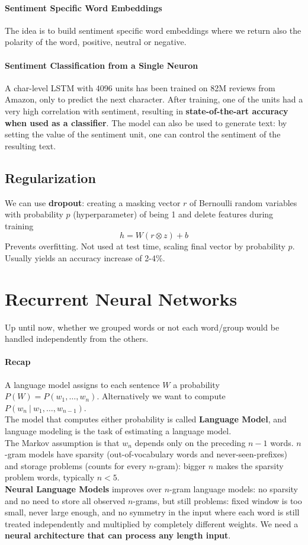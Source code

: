 \documentclass[10pt]{report}
\begin{document}
\paragraph{Sentiment Specific Word Embeddings} The idea is to build sentiment specific word embeddings where we return also the polarity of the word, positive, neutral or negative.
\paragraph{Sentiment Classification from a Single Neuron} A char-level LSTM with 4096 units has been trained on 82M reviews from Amazon, only to predict the next character. After training, one of the units had a very high correlation with sentiment, resulting in \textbf{state-of-the-art accuracy when used as a classifier}. The model can also be used to generate text: by setting the value of the sentiment unit, one can control the sentiment of the resulting text.
\subsection{Regularization} 
We can use \textbf{dropout}: creating a masking vector $r$ of Bernoulli random variables with probability $p$ (hyperparameter) of being 1 and delete features during training $$h = W(r\otimes z) + b$$
Prevents overfitting. Not used at test time, scaling final vector by probability $p$. Usually yields an accuracy increase of 2-4\%.
\section{Recurrent Neural Networks}
Up until now, whether we grouped words or not each word/group would be handled independently from the others.
\paragraph{Recap} A language model assigns to each sentence $W$ a probability $P(W) = P(w_1,\ldots,w_n)$. Alternatively we want to compute $P(w_n\:|\:w_1,\ldots,w_{n-1})$.\\
The model that computes either probability is called \textbf{Language Model}, and language modeling is the task of estimating a language model.\\
The Markov assumption is that $w_n$ depends only on the preceding $n-1$ words. $n$-gram models have sparsity (out-of-vocabulary words and never-seen-prefixes) and storage problems (counts for every $n$-gram): bigger $n$ makes the sparsity problem words, typically $n<5$.\\
\textbf{Neural Language Models} improves over $n$-gram language models: no sparsity and no need to store all observed $n$-grams, but still problems: fixed window is too small, never large enough, and no symmetry in the input where each word is still treated independently and multiplied by completely different weights. We need a \textbf{neural architecture that can process any length input}.
\end{document}
